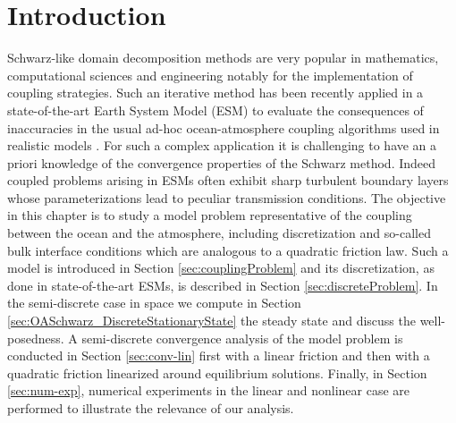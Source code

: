 \section{Introduction}
\label{sec:OASchwarz_Intro}
\par
Schwarz-like domain decomposition methods are very popular in 
mathematics, computational sciences and engineering notably for 
the implementation of coupling strategies. Such an iterative method
has been recently applied in a state-of-the-art Earth 
System Model (ESM) to evaluate the consequences of inaccuracies 
in the usual ad-hoc ocean-atmosphere coupling algorithms 
used in realistic models \citep{marti_schwarz_2021}. For such 
a complex application it is challenging to have an a priori 
knowledge of the convergence properties of the Schwarz method. 
Indeed coupled problems arising in ESMs often 
exhibit sharp turbulent boundary layers whose parameterizations 
lead to peculiar transmission conditions. The objective in
this chapter is to study a model problem representative 
of the coupling between the ocean and the atmosphere, including discretization 
and so-called bulk interface conditions which are analogous to a 
quadratic friction law. Such a model is introduced in Section \ref{sec:couplingProblem}
and its discretization, as done in state-of-the-art ESMs, 
is described in Section \ref{sec:discreteProblem}.
In the semi-discrete case in space we compute in Section
\ref{sec:OASchwarz_DiscreteStationaryState} the steady state
and discuss the well-posedness.
A semi-discrete convergence analysis of the model problem is conducted
in Section \ref{sec:conv-lin} first with a linear friction and then
with a quadratic friction linearized around equilibrium solutions. 
Finally, in Section \ref{sec:num-exp}, numerical experiments in the 
linear and nonlinear case are performed to illustrate the relevance 
of our analysis. \par
%

